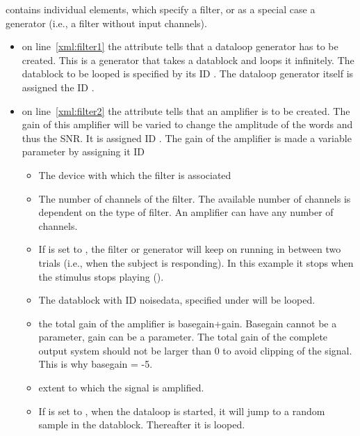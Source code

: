  contains individual  elements,
which specify a filter, or as a special case a generator (i.e., a
filter without input channels).
\begin{itemize}

\item {} on line~\ref{xml:filter1} the attribute
 tells \apex that a dataloop
generator has to be created. This is a generator that takes a
datablock and loops it infinitely. The datablock to be looped is
specified by its ID . The dataloop generator itself
is assigned the ID .


\item {} on line~\ref{xml:filter2} the attribute
 tells \apex that an amplifier is
to be created. The gain of this amplifier will be varied to change
the amplitude of the words and thus the SNR. It is assigned ID
. The gain of the amplifier is made a variable
parameter by assigning it ID 
\begin{itemize}
\item {} The device with which the filter is
associated \item {} The number of channels of the
filter. The available number of channels is dependent on the type
of filter. An amplifier can have any number of channels.

\item If  is set to , the filter or generator
will keep on running in between two trials (i.e., when the subject is responding).
 In this example it stops when the stimulus stops playing ().

\item {} The datablock with ID noisedata,
specified under  will be looped.

\item {} the total gain of the amplifier is
basegain+gain. Basegain cannot be a parameter, gain can be a
parameter. The total gain of the complete output system should not
be larger than 0 to avoid clipping of the signal. This is why
basegain = -5.

\item {} extent to which the signal is amplified.

\item If  is set to , when the dataloop is started, it will jump to a random sample in the datablock. Thereafter it is looped.
\end{itemize}
\end{itemize}

